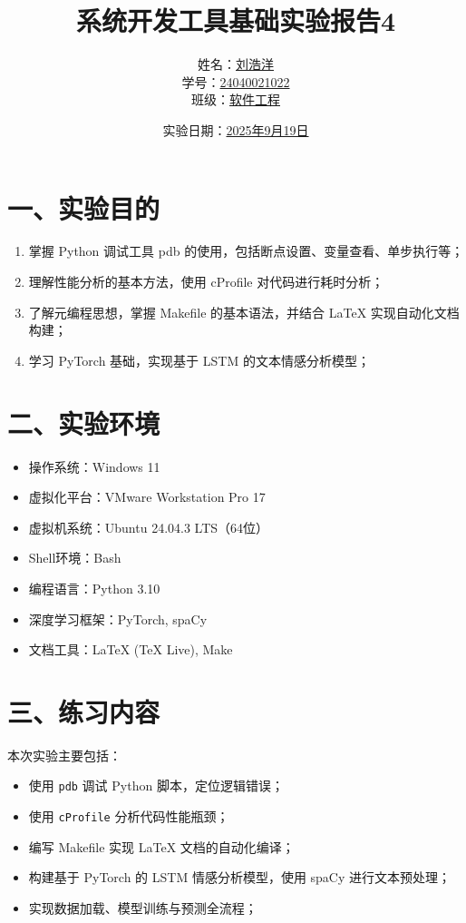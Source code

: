 \documentclass[a4paper, 12pt]{article}
\begin{document}
\title{\huge{系统开发工具基础实验报告4}}
\author{姓名：\underline{刘浩洋} \\ 
        学号：\underline{24040021022} \\ 
        班级：\underline{软件工程}}
\date{实验日期：\underline{2025年9月19日}}
\maketitle

\section*{一、实验目的}
\begin{enumerate}
    \item 掌握 Python 调试工具 pdb 的使用，包括断点设置、变量查看、单步执行等；
    \item 理解性能分析的基本方法，使用 cProfile 对代码进行耗时分析；
    \item 了解元编程思想，掌握 Makefile 的基本语法，并结合 LaTeX 实现自动化文档构建；
    \item 学习 PyTorch 基础，实现基于 LSTM 的文本情感分析模型；
\end{enumerate}

\section*{二、实验环境}
\begin{itemize}
    \item 操作系统：Windows 11
    \item 虚拟化平台：VMware Workstation Pro 17
    \item 虚拟机系统：Ubuntu 24.04.3 LTS（64位）
    \item Shell环境：Bash
    \item 编程语言：Python 3.10
    \item 深度学习框架：PyTorch, spaCy
    \item 文档工具：LaTeX (TeX Live), Make
\end{itemize}

\section*{三、练习内容}
本次实验主要包括：
\begin{itemize}
    \item 使用 \texttt{pdb} 调试 Python 脚本，定位逻辑错误；
    \item 使用 \texttt{cProfile} 分析代码性能瓶颈；
    \item 编写 Makefile 实现 LaTeX 文档的自动化编译；
    \item 构建基于 PyTorch 的 LSTM 情感分析模型，使用 spaCy 进行文本预处理；
    \item 实现数据加载、模型训练与预测全流程；
\end{itemize}
\end{document}
